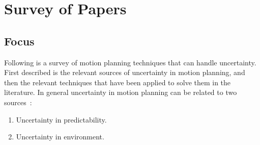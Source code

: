 \chapter{Survey of Papers}
\label{chp:survey-of-papers}

\section{Focus}
Following is a survey of motion planning techniques that can handle uncertainty.
First described is the relevant sources of uncertainty in motion planning, and
then the relevant techniques that have been applied to solve them in the
literature. In general uncertainty in motion planning can be related to two
sources~\cite{lavalleFrameworkMotionPlanning1995}:
\begin{enumerate}
\item Uncertainty in predictability.
\item Uncertainty in environment.
\end{enumerate}

